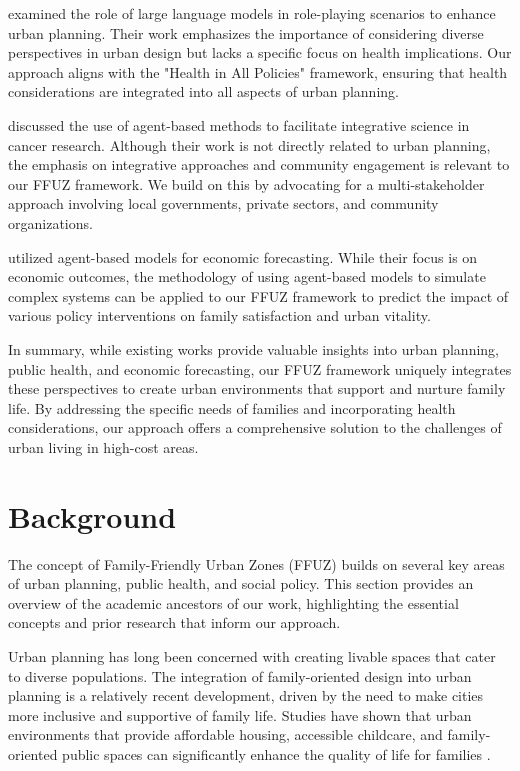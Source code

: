 \documentclass{article} %
\begin{document}
\citet{shanahan2023role} examined the role of large language models in role-playing scenarios to enhance urban planning. Their work emphasizes the importance of considering diverse perspectives in urban design but lacks a specific focus on health implications. Our approach aligns with the "Health in All Policies" framework, ensuring that health considerations are integrated into all aspects of urban planning.

\citet{west2023agent} discussed the use of agent-based methods to facilitate integrative science in cancer research. Although their work is not directly related to urban planning, the emphasis on integrative approaches and community engagement is relevant to our FFUZ framework. We build on this by advocating for a multi-stakeholder approach involving local governments, private sectors, and community organizations.

\citet{poledna2023economic} utilized agent-based models for economic forecasting. While their focus is on economic outcomes, the methodology of using agent-based models to simulate complex systems can be applied to our FFUZ framework to predict the impact of various policy interventions on family satisfaction and urban vitality.

In summary, while existing works provide valuable insights into urban planning, public health, and economic forecasting, our FFUZ framework uniquely integrates these perspectives to create urban environments that support and nurture family life. By addressing the specific needs of families and incorporating health considerations, our approach offers a comprehensive solution to the challenges of urban living in high-cost areas.

\section{Background}
\label{sec:background}

The concept of Family-Friendly Urban Zones (FFUZ) builds on several key areas of urban planning, public health, and social policy. This section provides an overview of the academic ancestors of our work, highlighting the essential concepts and prior research that inform our approach.

Urban planning has long been concerned with creating livable spaces that cater to diverse populations. The integration of family-oriented design into urban planning is a relatively recent development, driven by the need to make cities more inclusive and supportive of family life. Studies have shown that urban environments that provide affordable housing, accessible childcare, and family-oriented public spaces can significantly enhance the quality of life for families \citep{park2023generative, shanahan2023role}.
\end{document}
